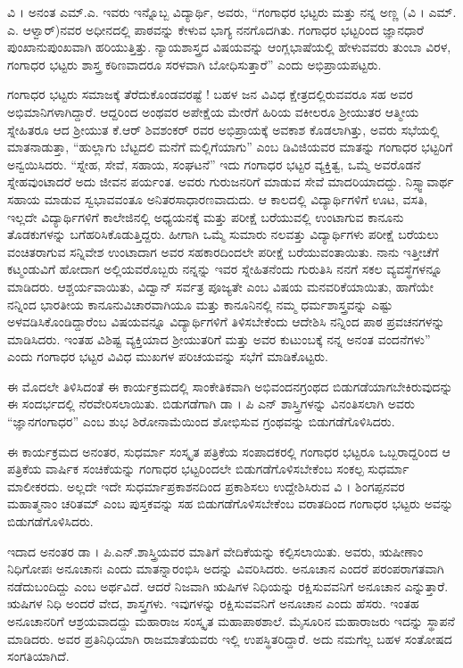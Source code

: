 {ವಿ । ಅನಂತ ಎಮ್.ಎ. ಇವರು ಇನ್ನೊಬ್ಬ ವಿದ್ಯಾರ್ಥಿ, ಅವರು, “ಗಂಗಾಧರ ಭಟ್ಟರು ಮತ್ತು ನನ್ನ ಅಣ್ಣ (ವಿ । ಎಮ್. ಎ. ಆಳ್ವಾರ್)ನವರ ಅಧೀನದಲ್ಲಿ ಪಾಠವನ್ನು ಕೇಳುವ ಭಾಗ್ಯ ನನಗೊದಗಿತು. ಗಂಗಾಧರ ಭಟ್ಟರಿಂದ ಜ್ಞಾನಧಾರೆ ಪುಂಖಾನುಪುಂಖ\-ವಾಗಿ ಹರಿಯುತ್ತಿತ್ತು. ನ್ಯಾಯಶಾಸ್ತ್ರದ ವಿಷಯವನ್ನು ಆಂಗ್ಲಭಾಷೆಯಲ್ಲಿ ಹೇಳುವವರು ತುಂಬಾ ವಿರಳ, ಗಂಗಾಧರ ಭಟ್ಟರು ಶಾಸ್ತ್ರ ಕಠಿಣವಾದರೂ ಸರಳವಾಗಿ ಬೋಧಿಸುತ್ತಾರೆ” ಎಂದು ಅಭಿಪ್ರಾಯಪಟ್ಟರು.

ಗಂಗಾಧರ ಭಟ್ಟರು ಸಮಾಜಕ್ಕೆ ತೆರೆದುಕೊಂಡವರಷ್ಟೆ ! ಬಹಳ ಜನ ವಿವಿಧ ಕ್ಷೇತ್ರ\-ದಲ್ಲಿರುವವರೂ ಸಹ ಅವರ ಅಭಿಮಾನಿಗಳಾಗಿದ್ದಾರೆ. ಆದ್ದರಿಂದ ಅಂಥವರ ಅಪೇಕ್ಷೆಯ ಮೇರೆಗೆ ಹಿರಿಯ ವಕೀಲರೂ ಶ್ರೀಯುತರ ಆತ್ಮೀಯ ಸ್ನೇಹಿತರೂ ಆದ  ಶ್ರೀಯುತ ಕೆ.ಆರ್ ಶಿವಶಂಕರ್ ರವರ ಅಭಿಪ್ರಾಯಕ್ಕೆ ಅವಕಾಶ ಕೊಡಲಾಗಿತ್ತು, ಅವರು ಸಭೆಯಲ್ಲಿ ಮಾತನಾಡುತ್ತಾ, “ಹುಲ್ಲಾಗು  ಬೆಟ್ಟದಲಿ ಮನೆಗೆ ಮಲ್ಲಿಗೆಯಾಗು” ಎಂಬ ಡಿವಿಜಿಯವರ ಮಾತನ್ನು ಗಂಗಾಧರ ಭಟ್ಟರಿಗೆ ಅನ್ವಯಿಸಿದರು. “ಸ್ನೇಹ, ಸೇವೆ, ಸಹಾಯ, \hbox{ಸಂಘಟನೆ”} ಇದು ಗಂಗಾಧರ ಭಟ್ಟರ ವ್ಯಕ್ತಿತ್ವ, ಒಮ್ಮೆ ಅವರೊಡನೆ ಸ್ನೇಹವುಂಟಾದರೆ ಅದು ಜೀವನ ಪರ್ಯಂತ. ಅವರು ಗುರುಜನರಿಗೆ ಮಾಡುವ ಸೇವೆ ಮಾದರಿಯಾದದ್ದು. ನಿಸ್ಸ್ವಾವಾರ್ಥ ಸಹಾಯ ಮಾಡುವ ಸ್ವಭಾವವಂತೂ ಅನಿತರಸಾಧಾರಣವಾದುದು. ಆ ಕಾಲದಲ್ಲಿ ವಿದ್ಯಾರ್ಥಿಗಳಿಗೆ ಊಟ, ವಸತಿ, ಇಲ್ಲದೇ ವಿದ್ಯಾರ್ಥಿಗಳಿಗೆ ಕಾಲೇಜಿನಲ್ಲಿ ಅಧ್ಯಯನಕ್ಕೆ ಮತ್ತು ಪರೀಕ್ಷೆ ಬರೆಯುವಲ್ಲಿ  ಉಂಟಾಗುವ ಕಾನೂನು ತೊಡಕುಗಳನ್ನು ಬಗೆಹರಿಸಿಕೊಡುತ್ತಿದ್ದರು. ಹೀಗಾಗಿ ಒಮ್ಮೆ ಸುಮಾರು ನಲವತ್ತು ವಿದ್ಯಾರ್ಥಿಗಳು ಪರೀಕ್ಷೆ ಬರೆಯಲು ವಂಚಿತರಾಗುವ ಸನ್ನಿವೇಶ ಉಂಟಾದಾಗ ಅವರ ಸಹಕಾರದಿಂದಲೇ ಪರೀಕ್ಷೆ ಬರೆಯುವಂತಾಯಿತು. ನಾನು ಇತ್ತೀಚೆಗೆ ಕಟ್ಮಂಡುವಿಗೆ ಹೋದಾಗ ಅಲ್ಲಿಯವರೊಬ್ಬರು ನನ್ನನ್ನು ಇವರ ಸ್ನೇಹಿತನೆಂದು ಗುರುತಿಸಿ ನನಗೆ ಸಕಲ ವ್ಯವಸ್ಥೆಗಳನ್ನೂ ಮಾಡಿದರು. ಆಶ್ಚರ್ಯವಾಯಿತು, ವಿದ್ವಾನ್ ಸರ್ವತ್ರ ಪೂಜ್ಯತೇ ಎಂಬ ವಿಷಯ ಮನವರಿಕೆಯಾಯಿತು, ಹಾಗೆಯೇ ನನ್ನಿಂದ ಭಾರತೀಯ ಕಾನೂನು\break ವಿಚಾರವಾಗಿಯೂ ಮತ್ತು ಕಾನೂನಿನಲ್ಲಿ ನಮ್ಮ ಧರ್ಮಶಾಸ್ತ್ರವನ್ನು ಎಷ್ಟು ಅಳವಡಿಸಿಕೊಂಡಿದ್ದಾರೆಂಬ ವಿಷಯವನ್ನೂ ವಿದ್ಯಾರ್ಥಿಗಳಿಗೆ ತಿಳಿಸಬೇಕೆಂದು ಆದೇಶಿಸಿ ನನ್ನಿಂದ ಪಾಠ \enginline{-} ಪ್ರವಚನಗಳನ್ನು ಮಾಡಿಸಿದರು. ಇಂತಹ ವಿಶಿಷ್ಟ ವ್ಯಕ್ತಿಯಾದ ಶ್ರೀಯುತರಿಗೆ ಮತ್ತು ಅವರ ಕುಟುಂಬಕ್ಕೆ ನನ್ನ ಅನಂತ ವಂದನೆಗಳು” ಎಂದು ಗಂಗಾಧರ ಭಟ್ಟರ ವಿವಿಧ ಮುಖಗಳ ಪರಿಚಯವನ್ನು ಸಭೆಗೆ ಮಾಡಿಕೊಟ್ಟರು.

ಈ ಮೊದಲೇ ತಿಳಿಸಿದಂತೆ ಈ ಕಾರ್ಯಕ್ರಮದಲ್ಲಿ ಸಾಂಕೇತಿಕವಾಗಿ ಅಭಿವಂದನ\-ಗ್ರಂಥದ ಬಿಡುಗಡೆಯಾಗಬೇಕಿರುವುದನ್ನು ಈ ಸಂದರ್ಭದಲ್ಲಿ ನೆರವೇರಿಸಲಾಯಿತು. ಬಿಡುಗಡೆಗಾಗಿ ಡಾ । ಪಿ ಎನ್ ಶಾಸ್ತ್ರಿಗಳನ್ನು ವಿನಂತಿಸಲಾಗಿ ಅವರು “ಜ್ಞಾನಗಂಗಾಧರ” ಎಂಬ ಶುಭ ಶಿರೋನಾಮೆಯಿಂದ ಶೋಭಿಸುವ ಗ್ರಂಥವನ್ನು ಬಿಡುಗಡೆಗೊಳಿಸಿದರು. 

ಈ ಕಾರ್ಯಕ್ರಮದ ಅನಂತರ, ಸುಧರ್ಮಾ ಸಂಸ್ಕೃತ ಪತ್ರಿಕೆಯ ಸಂಪಾದಕರಲ್ಲಿ ಗಂಗಾಧರ ಭಟ್ಟರೂ ಒಬ್ಬರಾದ್ದರಿಂದ ಆ ಪತ್ರಿಕೆಯ ವಾರ್ಷಿಕ ಸಂಚಿಕೆಯನ್ನು ಗಂಗಾಧರ ಭಟ್ಟರಿಂದಲೇ ಬಿಡುಗಡೆಗೊಳಿಸಬೇಕೆಂಬ ಸಂಕಲ್ಪ ಸುಧರ್ಮಾ ಮಾಲೀಕರದು. ಅಲ್ಲದೇ ಇದೇ ಸುಧರ್ಮಾಪ್ರಕಾಶನದಿಂದ ಪ್ರಕಾಶಿಸಲು ಉದ್ದೇಶಿಸಿರುವ ವಿ । ಶಿಂಗಪ್ಪನವರ ಮಹಾತ್ಮನಾಂ ಚರಿತಮ್ ಎಂಬ ಪುಸ್ತಕವನ್ನು ಸಹ ಬಿಡುಗಡೆಗೊಳಿಸಬೇಕೆಂಬ ವರಾತದಿಂದ ಗಂಗಾಧರ ಭಟ್ಟರು ಅವನ್ನು ಬಿಡುಗಡೆಗೊಳಿಸಿದರು.
\vskip 5pt

ಇದಾದ ಅನಂತರ ಡಾ । ಪಿ.ಎನ್.ಶಾಸ್ತ್ರಿಯವರ ಮಾತಿಗೆ ವೇದಿಕೆಯನ್ನು ಕಲ್ಪಿಸ\-ಲಾಯಿತು. ಅವರು, ಋಷೀಣಾಂ ನಿಧಿಗೋಪಃ ಅನೂಚಾನಃ ಎಂದು \hbox{ಮಾತನ್ನಾರಂಭಿಸಿ} ಅದನ್ನು ವಿವರಿಸಿದರು. ಅನೂಚಾನ ಎಂದರೆ ಪರಂಪರಾಗತವಾಗಿ ನಡೆದುಬಂದಿದ್ದು ಎಂಬ ಅರ್ಥವಿದೆ. ಆದರೆ ನಿಜವಾಗಿ ಋಷಿಗಳ ನಿಧಿಯನ್ನು ರಕ್ಷಿಸುವವನಿಗೆ ಅನೂಚಾನ ಎನ್ನುತ್ತಾರೆ. ಋಷಿಗಳ ನಿಧಿ ಅಂದರೆ \enginline{-} ವೇದ, ಶಾಸ್ತ್ರಗಳು. ಇವುಗಳನ್ನು ರಕ್ಷಿಸುವವನಿಗೆ ಅನೂಚಾನ ಎಂದು ಹೆಸರು. ಇಂತಹ ಅನೂಚಾನರಿಗೆ ಆಶ್ರಯವಾದದ್ದು ಮಹಾರಾಜ ಸಂಸ್ಕೃತ ಮಹಾಪಾಠಶಾಲೆ. ಮೈಸೂರಿನ ಮಹಾರಾಜರು ಇದನ್ನು ಸ್ಥಾಪನೆ ಮಾಡಿದರು. ಅವರ ಪ್ರತಿನಿಧಿಯಾಗಿ ರಾಜಮಾತೆಯವರು ಇಲ್ಲಿ ಉಪಸ್ಥಿತರಿದ್ದಾರೆ. ಅದು ನಮಗೆಲ್ಲ ಬಹಳ ಸಂತೋಷದ ಸಂಗತಿಯಾಗಿದೆ. 
\vskip 5pt

}
